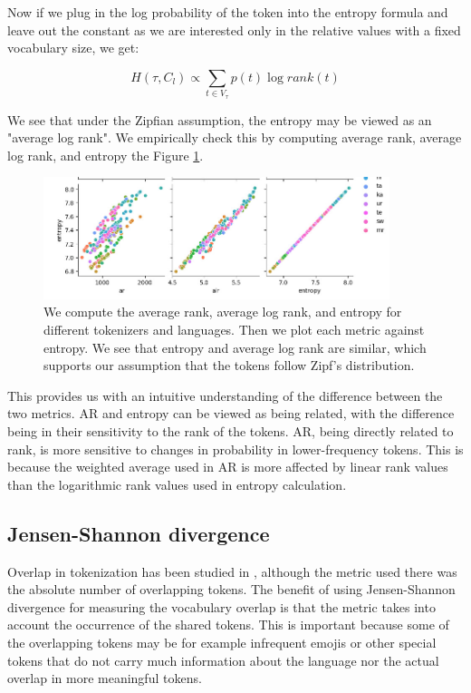 Now if we plug in the log probability of the token into the entropy formula and leave out the constant as we are interested only in the relative values with a fixed vocabulary size, we get:

\begin{equation}
    H(\tau, C_l) \propto \sum_{t \in V_\tau} p(t) \log rank(t)
\end{equation}

We see that under the Zipfian assumption, the entropy may be viewed as an "average log rank". We empirically check this by computing average rank, average log rank, and entropy the Figure \ref{fig:ar_alr_entropy}.

\begin{figure}
    \centering
    \includegraphics[width=0.9\textwidth]{img/temp/ar_alr_entropy.jpg}
    \caption{We compute the average rank, average log rank, and entropy for different tokenizers and languages. Then we plot each metric against entropy. We see that entropy and average log rank are similar, which supports our assumption that the tokens follow Zipf's distribution.}
    \label{fig:ar_alr_entropy}
\end{figure}

This provides us with an intuitive understanding of the difference between the two metrics. AR and entropy can be viewed as being related, with the difference being in their sensitivity to the rank of the tokens. AR, being directly related to rank, is more sensitive to changes in probability in lower-frequency tokens. This is because the weighted average used in AR is more affected by linear rank values than the logarithmic rank values used in entropy calculation.

\subsection{Jensen-Shannon divergence}

Overlap in tokenization has been studied in \citet{wu_beto_2019}, although the metric used there was the absolute number of overlapping tokens. The benefit of using Jensen-Shannon divergence for measuring the vocabulary overlap is that the metric takes into account the occurrence of the shared tokens. This is important because some of the overlapping tokens may be for example infrequent emojis or other special tokens that do not carry much information about the language nor the actual overlap in more meaningful tokens.

